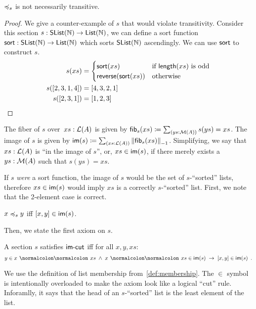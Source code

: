 \begin{toappendix}
    \begin{proposition}
        \label{prop:counterexample-transitivity}
        $\preccurlyeq_{s}$ is not necessarily transitive.
    \end{proposition}
    \begin{proof}
        We give a counter-example of $s$ that would violate transitivity.
        Consider this section $s : \operatorname{\mathsf{SList}}(\mathbb{N}) \to \operatorname{\mathsf{List}}(\mathbb{N})$, we can define a sort function
        $\operatorname{\mathsf{sort}} : \operatorname{\mathsf{SList}}(\mathbb{N}) \to \operatorname{\mathsf{List}}(\mathbb{N})$ which sorts $\operatorname{\mathsf{SList}}(\mathbb{N})$ ascendingly. We can use $\operatorname{\mathsf{sort}}$
        to construct $s$.
        \begin{align*}
            s(xs)        & = \begin{cases}
                                 \operatorname{\mathsf{sort}}(xs)                 & \text{if $\operatorname{\mathsf{length}}(xs)$ is odd} \\
                                 \operatorname{\mathsf{reverse}}(\operatorname{\mathsf{sort}}(xs)) & \text{otherwise}
                             \end{cases} \\
            s([2,3,1,4]) & = [4,3,2,1]                                                                     \\
            s([2,3,1])   & = [1,2,3]
        \end{align*}
    \end{proof}
\end{toappendix}

\begin{definition}[$\blank\in\im{s}$]
    \label{def:in-image}
    The fiber of $s$ over~$xs : \mathcal{L}(A)$ is given by $\fib_{s}(xs) \defeq \dsum{ys : \MM(A)}{s(ys) = xs}$.
    The image of $s$ is given by $\im{s} \defeq \dsum{xs : \LL(A)}{\Trunc[-1]{\fib_{s}(xs)}}$.
    Simplifying, we say that $xs:\mathcal{L}(A)$ is ``in the image of $s$'', or, $xs \in \im{s}$,
    if there merely exists a $ys:\mathcal{M}(A)$ such that $s(ys) = xs$.
\end{definition}

If $s$ \emph{were} a sort function, the image of $s$ would be the set of $s$-``sorted'' lists,
therefore $\inimage{xs}$ would imply $xs$ is a correctly $s$-``sorted'' list.
%
First, we note that the 2-element case is correct.
%
\begin{proposition}
    \label{sort:sort-to-order}
    $x \preccurlyeq_{s} y$ \; iff \; $\inimage{[x, y]}$.
\end{proposition}
%
\noindent Then, we state the first axiom on $s$.
\begin{definition}[$\isheadleast$]
    \label{sort:head-least}
    A section $s$ satisfies $\isheadleast$ iff for all $x, y, xs$:
    \[
        y \in x \cons xs \; \land \; \inimage{x \cons xs} \; \to \; \inimage{[x, y]}
        \enspace.
    \]
\end{definition}
\noindent
We use the definition of list membership from~\cref{def:membership}.
The $\in$ symbol is intentionally overloaded
to make the axiom look like a logical ``cut'' rule.
Inforamlly, it says that the head of an $s$-``sorted'' list
is the least element of the list.

